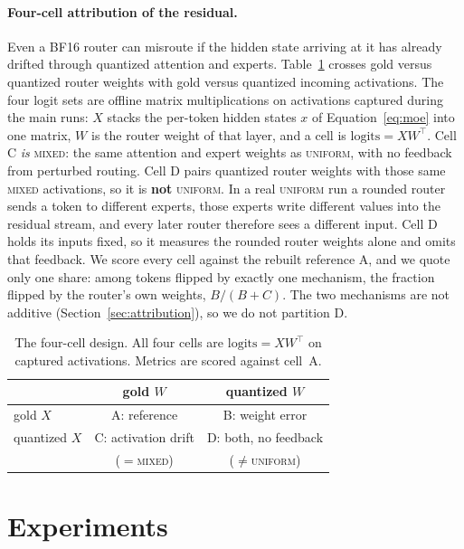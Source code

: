 \documentclass[11pt]{article}
\newcommand{\uniform}{\textsc{uniform}}
\newcommand{\mixed}{\textsc{mixed}}
\begin{document}
\paragraph{Four-cell attribution of the residual.}
Even a BF16 router can misroute if the hidden state arriving at it has
already drifted through quantized attention and experts. Table~\ref{tab:fourcell}
crosses gold versus quantized router weights with gold versus
quantized incoming activations. The four logit sets are offline matrix
multiplications on activations captured during the main runs: $X$ stacks
the per-token hidden states $x$ of Equation~\ref{eq:moe} into one matrix,
$W$ is the router weight of that layer, and a cell is
$\mathrm{logits}=XW^{\top}$. Cell C \emph{is} \mixed{}: the same attention and expert
weights as \uniform{}, with no feedback from perturbed routing. Cell D
pairs quantized router weights with those same \mixed{} activations, so it
is \textbf{not} \uniform{}. In a real \uniform{} run a rounded router sends
a token to different experts, those experts write different values into the
residual stream, and every later router therefore sees a different input.
Cell D holds its inputs fixed, so it measures the rounded router weights
alone and omits that feedback. We score every cell against the rebuilt reference A,
and we quote only one share: among tokens flipped by exactly one
mechanism, the fraction flipped by the router's own weights, $B/(B{+}C)$.
The two mechanisms are not additive (Section~\ref{sec:attribution}), so we
do not partition D.

\begin{table}[t]
\centering
\small
\setlength{\tabcolsep}{3pt}
\begin{tabular}{lcc}
\toprule
 & gold $W$ & quantized $W$ \\
\midrule
gold $X$ & A: reference & B: weight error \\
quantized $X$ & C: activation drift & D: both, no feedback \\
 & ($=$\mixed{}) & ($\neq$\uniform{}) \\
\bottomrule
\end{tabular}
\caption{The four-cell design. All four cells are
  $\mathrm{logits}=XW^{\top}$ on captured activations. Metrics are scored
  against cell~A.}
\label{tab:fourcell}
\end{table}

\section{Experiments}
\label{sec:results}
\end{document}
